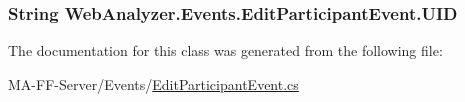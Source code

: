\subsubsection[{U\+I\+D}]{\setlength{\rightskip}{0pt plus 5cm}String Web\+Analyzer.\+Events.\+Edit\+Participant\+Event.\+U\+I\+D\hspace{0.3cm}{\ttfamily [get]}}\label{class_web_analyzer_1_1_events_1_1_edit_participant_event_acef746eb86f5262d48b583822b20cfcc}


The documentation for this class was generated from the following file\+:\begin{DoxyCompactItemize}
\item 
M\+A-\/\+F\+F-\/\+Server/\+Events/\hyperlink{_edit_participant_event_8cs}{Edit\+Participant\+Event.\+cs}\end{DoxyCompactItemize}
